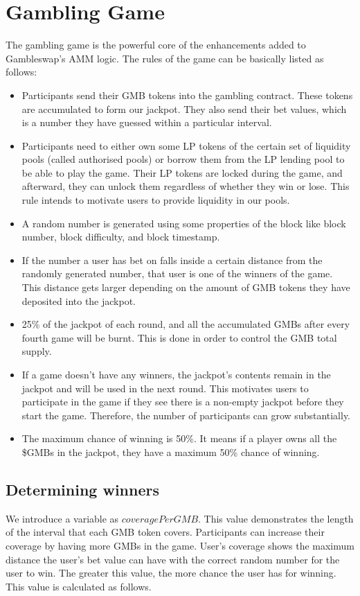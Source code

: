 \documentclass{article}
\begin{document}
\section{Gambling Game}
The gambling game is the powerful core of the enhancements added to Gambleswap's AMM logic. The rules of the game can be basically listed as follows:
\begin{itemize}
    \item Participants send their GMB tokens into the gambling contract. These tokens are accumulated to form our jackpot. They also send their bet values, which is a number they have guessed within a particular interval.
    \item Participants need to either own some LP tokens of the certain set of liquidity pools (called authorised pools) or borrow them from the LP lending pool to be able to play the game. Their LP tokens are locked during the game, and afterward, they can unlock them regardless of whether they win or lose. This rule intends to motivate users to provide liquidity in our pools.
    \item A random number is generated using some properties of the block like block number, block difficulty, and block timestamp.
    \item If the number a user has bet on falls inside a certain distance from the randomly generated number, that user is one of the winners of the game. This distance gets larger depending on the amount of GMB tokens they have deposited into the jackpot.
    \item 25\% of the jackpot of each round, and all the accumulated GMBs after every fourth game will be burnt. This is done in order to control the GMB total supply. 
    \item If a game doesn't have any winners, the jackpot's contents remain in the jackpot and will be used in the next round. This motivates users to participate in the game if they see there is a non-empty jackpot before they start the game. Therefore, the number of participants can grow substantially.
    \item The maximum chance of winning is 50\%. It means if a player owns all the \$GMBs in the jackpot, they have a maximum 50\% chance of winning. 
\end{itemize}

\subsection{Determining winners}
We introduce a variable as $coveragePerGMB$. This value demonstrates the length of the interval that each GMB token covers. Participants can increase their coverage by having more GMBs in the game. User's coverage shows the maximum distance the user's bet value can have with the correct random number for the user to win. The greater this value, the more chance the user has for winning. This value is calculated as follows. 
\end{document}
